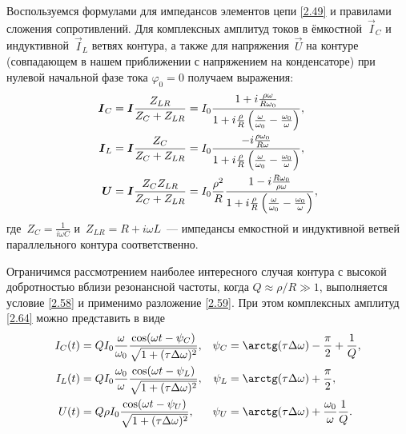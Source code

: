 Воспользуемся формулами для импедансов элементов цепи \eqref{2.49} 
и правилами сложения сопротивлений. Для комплексных амплитуд токов 
в ёмкостной~$\vec I_C$ и индуктивной~$\vec I_L$ ветвях контура, а также для 
напряжения~$\vec U$ на контуре 
(совпадающем в нашем приближении с напряжением на конденсаторе) при
нулевой начальной фазе тока $\varphi_0=0$ получаем выражения:
\begin{equation}
\begin{aligned}
	\eqmark{2.64}
			\vec I_C & =\vec
I\dfrac{Z_{LR}}{Z_C+Z_{LR}}=I_0
\dfrac{1+i\frac{\rho\omega}{R\omega_0}}%
{1+i\frac{\rho}{R}\left(\frac{\omega}{\omega_0}-\frac{\omega_0}{\omega}\right)}, \\
			\vec I_L & =\vec
I\dfrac{Z_C}{Z_C+Z_{LR}}=I_0
\dfrac{-i\frac{\rho\omega_0}{R\omega}}%
{1+i\frac{\rho}{R}\left(\frac{\omega}{\omega_0}-\frac{\omega_0}{\omega}\right)}, \\
			\vec U & =\vec
I\dfrac{Z_CZ_{LR}}{Z_C+Z_{LR}}=
I_0\frac{\rho^2}{R}
\dfrac{1-i\frac{R\omega_0}{\rho\omega}}%
{1+i\frac{\rho}{R}\left(\frac{\omega}{\omega_0}-\frac{\omega_0}{\omega}\right)},
\end{aligned}
\end{equation}
где~$Z_C=\frac{1}{i\omega C}$ и~$Z_{LR}=R+i\omega L$~--- импедансы емкостной и индуктивной ветвей параллельного
контура соответственно.

Ограничимся рассмотрением наиболее интересного случая контура с высокой
добротностью вблизи резонансной частоты, когда 
$Q\approx \rho/R\gg1$, выполняется
условие \eqref{2.58} и применимо разложение \eqref{2.59}. При этом
 комплексных амплитуд \eqref{2.64}
можно представить в виде
\begin{equation}
\eqmark{2.65}
\begin{aligned}
			I_C(t)&=QI_0\dfrac{\omega}{\omega_0}\dfrac{\cos(\omega
t-\psi_C)}{\sqrt{1+(\tau\Delta\omega)^2}}, &
\psi_C&=\arctg(\tau\Delta\omega)-\dfrac{\pi}{2}+\frac1Q,\\
			I_L(t)&=QI_0\dfrac{\omega_0}{\omega}\dfrac{\cos(\omega
t-\psi_L)}{\sqrt{1+(\tau\Delta\omega)^2}}, &
\psi_L&=\arctg(\tau\Delta\omega)+\dfrac{\pi}{2},\\
			U(t)&=Q\rho I_0\dfrac{\cos(\omega
t-\psi_U)}{\sqrt{1+(\tau\Delta\omega)^2}}, &
\psi_U&=\arctg(\tau\Delta\omega)+\frac{\omega_0}{\omega}\frac1Q.
\end{aligned}
\end{equation}

